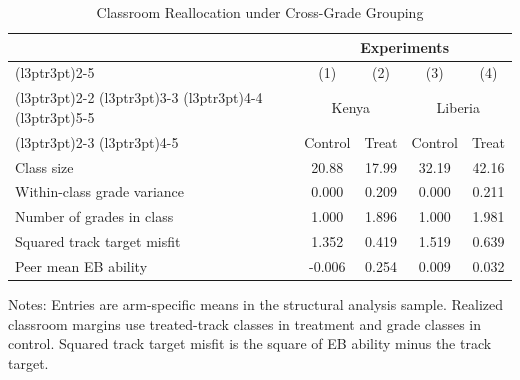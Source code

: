 \begin{table}[H]
\centering
\caption{Classroom Reallocation under Cross-Grade Grouping}
\label{tab:classroom_reallocation}
\begin{threeparttable}
\begin{tabular}[t]{lcccc}
\toprule
\multicolumn{1}{c}{ } & \multicolumn{4}{c}{Experiments} \\
\cmidrule(l{3pt}r{3pt}){2-5}
\multicolumn{1}{c}{ } & \multicolumn{1}{c}{(1)} & \multicolumn{1}{c}{(2)} & \multicolumn{1}{c}{(3)} & \multicolumn{1}{c}{(4)} \\
\cmidrule(l{3pt}r{3pt}){2-2} \cmidrule(l{3pt}r{3pt}){3-3} \cmidrule(l{3pt}r{3pt}){4-4} \cmidrule(l{3pt}r{3pt}){5-5}
 & \multicolumn{2}{c}{Kenya} & \multicolumn{2}{c}{Liberia} \\
\cmidrule(l{3pt}r{3pt}){2-3} \cmidrule(l{3pt}r{3pt}){4-5}
 & Control & Treat & Control & Treat \\
\midrule
Class size &  20.88 &  17.99 &  32.19 &  42.16 \\
Within-class grade variance &  0.000 &  0.209 &  0.000 &  0.211 \\
Number of grades in class &  1.000 &  1.896 &  1.000 &  1.981 \\
Squared track target misfit &  1.352 &  0.419 &  1.519 &  0.639 \\
Peer mean EB ability & -0.006 &  0.254 &  0.009 &  0.032 \\
\bottomrule
\end{tabular}
\begin{tablenotes}[para]
\item Notes: Entries are arm-specific means in the structural analysis sample. Realized classroom margins use treated-track classes in treatment and grade classes in control. Squared track target misfit is the square of EB ability minus the track target.
\end{tablenotes}
\end{threeparttable}
\end{table}
